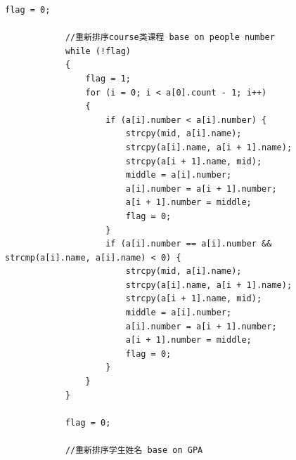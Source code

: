 \documentclass[fontset=windows]{article}
\begin{document}
\begin{lstlisting}[style = {cppstyle}]
			flag = 0;

			//重新排序course类课程 base on people number
			while (!flag)
			{
				flag = 1;
				for (i = 0; i < a[0].count - 1; i++)
				{
					if (a[i].number < a[i].number) {
						strcpy(mid, a[i].name);
						strcpy(a[i].name, a[i + 1].name);
						strcpy(a[i + 1].name, mid);
						middle = a[i].number;
						a[i].number = a[i + 1].number;
						a[i + 1].number = middle;
						flag = 0;
					}
					if (a[i].number == a[i].number && strcmp(a[i].name, a[i].name) < 0) {
						strcpy(mid, a[i].name);
						strcpy(a[i].name, a[i + 1].name);
						strcpy(a[i + 1].name, mid);
						middle = a[i].number;
						a[i].number = a[i + 1].number;
						a[i + 1].number = middle;
						flag = 0;
					}
				}
			}

			flag = 0;

			//重新排序学生姓名 base on GPA


\end{lstlisting}
\end{document}
